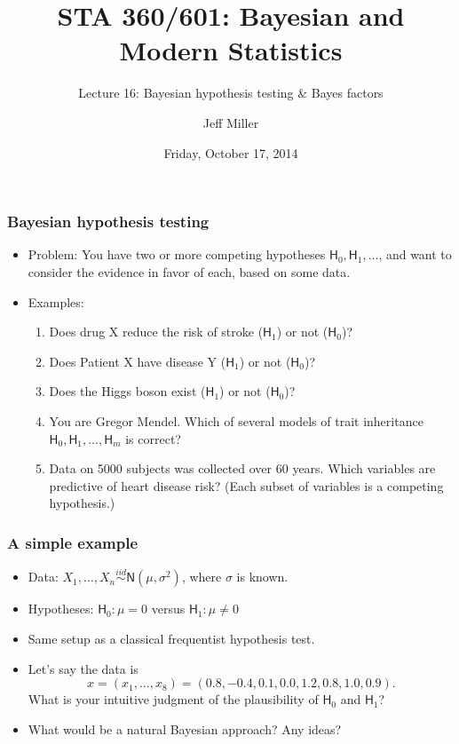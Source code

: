 \documentclass[handout]{beamer}
\title{STA 360/601: Bayesian and Modern Statistics}
\subtitle{Lecture 16: Bayesian hypothesis testing \& Bayes factors}
\author{Jeff Miller}
\institute{Department of Statistical Science, Duke University}
\date{Friday, October 17, 2014}
\def\N{\textsf{N}}
\def\iid{\stackrel{iid}{\sim}}
\def\H{\textsf{H}}
\begin{document}
\frame{\titlepage}




\begin{frame}
\frametitle{Bayesian hypothesis testing}
\begin{itemize}
\item Problem: You have two or more competing hypotheses $\H_0,\H_1,\dotsc$, and want to consider the evidence in favor of each, based on some data.
\item Examples:
\begin{enumerate}
\item Does drug X reduce the risk of stroke ($\H_1$) or not ($\H_0$)?
\item Does Patient X have disease Y ($\H_1$) or not ($\H_0$)?
\item Does the Higgs boson exist ($\H_1$) or not ($\H_0$)?
\item You are Gregor Mendel. Which of several models of trait inheritance $\H_0,\H_1,\dotsc,\H_m$ is correct?
\item Data on 5000 subjects was collected over 60 years. Which variables are predictive of heart disease risk? (Each subset of variables is a competing hypothesis.)
\end{enumerate}
\end{itemize}
\end{frame}


\begin{frame}
\frametitle{A simple example}
\begin{itemize}
\item Data: $X_1,\dotsc, X_n\iid \N(\mu,\sigma^2)$, where $\sigma$ is known.
\item Hypotheses: $\H_0:\mu = 0$ versus $\H_1:\mu\neq 0$
\item Same setup as a classical frequentist hypothesis test.
\item Let's say the data is
$$x = (x_1,\dotsc,x_8) = (0.8, -0.4, 0.1, 0.0, 1.2, 0.8, 1.0, 0.9).$$
 What is your intuitive judgment of the plausibility of $\H_0$ and $\H_1$?
\item What would be a natural Bayesian approach? Any ideas?
\end{itemize}
\end{frame}
\end{document}
